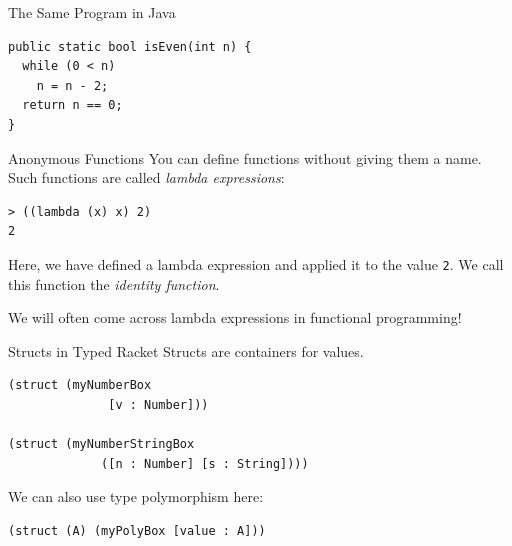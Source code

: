 \documentclass{beamer}
\begin{document}
\begin{frame}[fragile]{The Same Program in Java}
\begin{lstlisting}[style=Java]
public static bool isEven(int n) {
  while (0 < n)
    n = n - 2;
  return n == 0;
}
\end{lstlisting}
\end{frame}

\begin{frame}[fragile]{Anonymous Functions}
You can define functions without giving them a name. Such functions are called \textit{lambda expressions}:

\begin{lstlisting}
> ((lambda (x) x) 2)
2
\end{lstlisting}

\pause{}

Here, we have defined a lambda expression and applied it to the value \lstinline{2}. We call this function  the \textit{identity function}.

\pause{}

\vspace{1cm}

We will often come across lambda expressions in functional programming!
\end{frame}

\begin{frame}[fragile]{Structs in Typed Racket}
Structs are containers for values.

\begin{lstlisting}
(struct (myNumberBox
              [v : Number]))

(struct (myNumberStringBox
             ([n : Number] [s : String])))
\end{lstlisting}

\pause{}

We can also use type polymorphism here:

\begin{lstlisting}
(struct (A) (myPolyBox [value : A]))
\end{lstlisting}
\end{frame}
\end{document}
